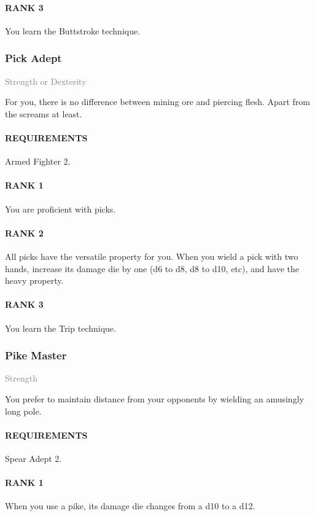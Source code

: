 \paragraph{RANK 3} You learn the Buttstroke technique.

\subsubsection{Pick Adept} \label{feat::pickadept}
\small{\textcolor{gray}{Strength or Dexterity}}

\normalsize
For you, there is no difference between mining ore and piercing flesh.
Apart from the screams at least.
\paragraph{REQUIREMENTS} Armed Fighter 2.
\paragraph{RANK 1} You are proficient with picks.
\paragraph{RANK 2} All picks have the versatile property for you.
When you wield a pick with two hands, increase its damage die by one (d6 to d8, d8 to d10, etc), and have the heavy property.
\paragraph{RANK 3} You learn the Trip technique.

\subsubsection{Pike Master} \label{feat::pikemaster}
\small{\textcolor{gray}{Strength}}

\normalsize
You prefer to maintain distance from your opponents by wielding an amusingly long pole.
\paragraph{REQUIREMENTS} Spear Adept 2.
\paragraph{RANK 1} When you use a pike, its damage die changes from a d10 to a d12.

